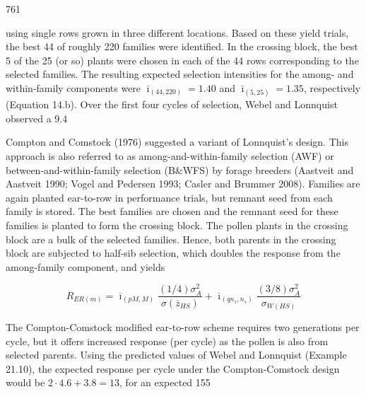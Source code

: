 \documentclass{article}
\begin{document}
761

using single rows grown in three different locations. Based on these yield trials, the best 44 of roughly 220 families were identified. In the crossing block, the best 5 of the 25 (or so) plants were chosen in each of the 44 rows corresponding to the selected families. The resulting expected selection intensities for the among- and within-family components were  $ \bar{\imath}_{(44,220)} = 1.40 $ and  $ \bar{\imath}_{(5,25)} = 1.35 $, respectively (Equation 14.b). Over the first four cycles of selection, Webel and Lonnquist observed a 9.4%

Compton and Comstock (1976) suggested a variant of Lonnquist's design. This approach is also referred to as among-and-within-family selection (AWF) or between-and-within-family selection (B&WFS) by forage breeders (Aastveit and Aastveit 1990; Vogel and Pedersen 1993; Casler and Brummer 2008). Families are again planted ear-to-row in performance trials, but remnant seed from each family is stored. The best families are chosen and the remnant seed for these families is planted to form the crossing block. The pollen plants in the crossing block are a bulk of the selected families. Hence, both parents in the crossing block are subjected to half-sib selection, which doubles the response from the among-family component, and yields

\begin{equation}
R_{ER(m)}=\overline{\imath}_{(pM,M)}\frac{(1/4)\sigma_{A}^{2}}{\sigma\left(\overline{z}_{HS}\right)}+\overline{\imath}_{(qn_{s},n_{s})}\frac{(3/8)\sigma_{A}^{2}}{\sigma_{W(HS)}}
\tag{21.49}
\label{eq:21_49}
\end{equation}

The Compton-Comstock modified ear-to-row scheme requires two generations per cycle, but it offers increased response (per cycle) as the pollen is also from selected parents. Using the predicted values of Webel and Lonnquist (Example 21.10), the expected response per cycle under the Compton-Comstock design would be  $ 2 \cdot 4.6 + 3.8 = 13 $, for an expected 155%
\end{document}
